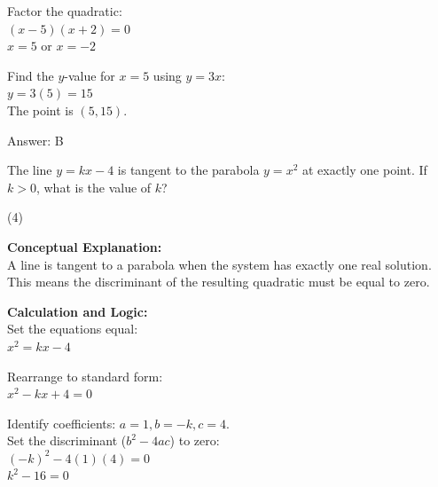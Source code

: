 \documentclass[11pt,paper=a4,answers]{exam}
\begin{document}
\begin{questions}
\begin{solution}
\vspace{10pt}

Factor the quadratic: \\
$(x - 5)(x + 2) = 0$ \\
$x = 5$ or $x = -2$

\vspace{10pt}

Find the $y$-value for $x = 5$ using $y = 3x$: \\
$y = 3(5) = 15$ \\
The point is $(5, 15)$.

\vspace{25pt}

Answer: \colorbox{yellow!100}{B}
\end{solution}

\vspace{40pt}

\question
The line $y = kx - 4$ is tangent to the parabola $y = x^2$ at exactly one point. If $k > 0$, what is the value of $k$?
\begin{tasks}(4)
\end{tasks}

\begin{solution}
\textbf{Conceptual Explanation:} \\
A line is tangent to a parabola when the system has exactly one real solution. This means the discriminant of the resulting quadratic must be equal to zero.

\vspace{20pt}

\textbf{Calculation and Logic:} \\
Set the equations equal: \\
$x^2 = kx - 4$

\vspace{10pt}

Rearrange to standard form: \\
$x^2 - kx + 4 = 0$

\vspace{10pt}

Identify coefficients: $a = 1, b = -k, c = 4$. \\
Set the discriminant ($b^2 - 4ac$) to zero: \\
$(-k)^2 - 4(1)(4) = 0$ \\
$k^2 - 16 = 0$

\vspace{10pt}


\end{solution}
\end{questions}
\end{document}
